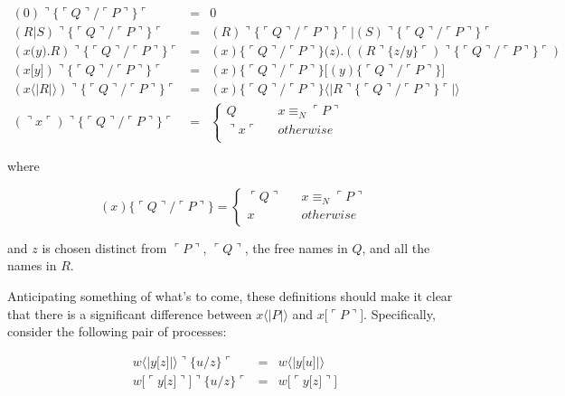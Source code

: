 \documentclass[]{amsart}
\newcommand{\lliftb}{\langle\!|}
\newcommand{\rliftb}{|\!\rangle}
\newcommand{\lpquote}{\ulcorner}
\newcommand{\rpquote}{\urcorner}
\newcommand{\id}[1]{\texttt{#1}}
\newcommand{\juxtap}{\mathbin{\id{|}}}
\newcommand{\concat}{\mathbin{\id{.}}}
\newcommand{\nameeq}{\mathbin{\equiv_N}}
\newcommand{\lift}[2]{#1 \lliftb #2 \rliftb}
\newcommand{\quotep}[1]{\lpquote #1 \rpquote}
\newcommand{\dropn}[1]{\rpquote #1 \lpquote}
\newcommand{\substp}[2]{\id{\{} \quotep{#1} / \quotep{#2} \id{\}}}
\newcommand{\substn}[2]{\id{\{} #1 / #2 \id{\}}}
\newcommand{\psubstp}[2]{\dropn{\substp{#1}{#2}}}
\newcommand{\psubstn}[2]{\dropn{\substn{#1}{#2}}}
\theoremstyle{definition}
\theoremstyle{remark}
\numberwithin{equation}{subsection}
\begin{document}
\begin{eqnarray*}
(0) \psubstp{Q}{P}         & = &    0 \\
(R \juxtap S) \psubstp{Q}{P}
		& = &    
		(R)\psubstp{Q}{P} \juxtap (S) \psubstp{Q}{P} \\
(x \id{(} y\id{)}\concat R) \psubstp{Q}{P}    
		& = &    
		(x)\substp{Q}{P} \id{(}z\id{)}\concat( (R \psubstn{z}{y}) \psubstp{Q}{P} ) \\
(x\id{[}y\id{]}) \psubstp{Q}{P}
		& = &    
		(x)\substp{Q}{P} \id{[}(y)\substp{Q}{P} \id{]} \\
(\lift{x}{R}) \psubstp{Q}{P}  
 		& = &
 		\lift{(x)\substp{Q}{P}}{ R \psubstp{Q}{P} } \\
(\dropn{x})  \psubstp{Q}{P}       
		& = & 
		\left\{ 
			\begin{array}{ccc} 
				Q & & x \nameeq \quotep{P} \\
                              	\dropn{x} & & otherwise \\
			\end{array}
		\right.
\end{eqnarray*}
 

where

\begin{equation*}
(x)\id{\{} \lpquote Q \rpquote / \lpquote P \rpquote \id{\}}            = 
		\left\{ 
			\begin{array}{ccc}
				\lpquote Q \rpquote & & x \nameeq \lpquote P \rpquote \\
                                x & & otherwise \\
			\end{array}
		\right.
\end{equation*}

and $z$ is chosen distinct from $\quotep{P}$, $\quotep{Q}$, the free
names in $Q$, and all the names in $R$.

Anticipating something of what's to come, these definitions should
make it clear that there is a significant difference between
$\lift{x}{P}$ and
$x\id{[}\lpquote P \rpquote\id{]}$. Specifically, consider the following pair of processes:

\begin{eqnarray*}
	\lift{w}{y \id{[}z\id{]}}\dropn{\id{\{}u / z \id{\}}}
		& = &
		\lift{w}{y \id{[}u\id{]}} \\
	w\id{[} \lpquote y\id{[}z\id{]} \rpquote \id{]} \rpquote \id{\{}u / z \id{\}} \lpquote
		& = &
		w\id{[} \lpquote y\id{[}z\id{]} \rpquote \id{]}
\end{eqnarray*}
\end{document}

